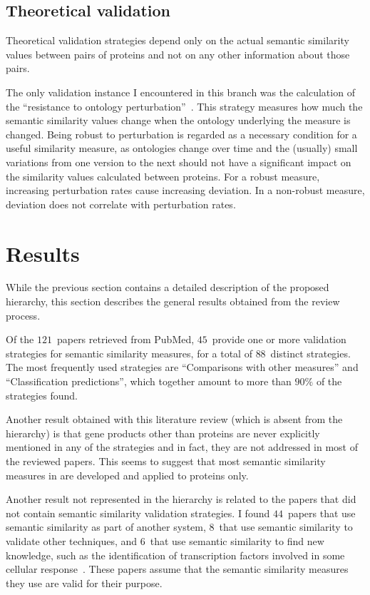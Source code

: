 \subsection{Theoretical validation} \label{sub:hierarchy/theoretical}

Theoretical validation strategies depend only on the actual semantic similarity values between pairs of proteins and not on any other information about those pairs.

The only validation instance I encountered in this branch was the calculation of the ``resistance to ontology perturbation''~\citep{Mathur2012}. This strategy measures how much the semantic similarity values change when the ontology underlying the measure is changed. Being robust to perturbation is regarded as a necessary condition for a useful similarity measure, as ontologies change over time and the (usually) small variations from one version to the next should not have a significant impact on the similarity values calculated between proteins. For a robust measure, increasing perturbation rates cause increasing deviation. In a non-robust measure, deviation does not correlate with perturbation rates.


\section{Results} \label{sec:validation/results}

While the previous section contains a detailed description of the proposed hierarchy, this section describes the general results obtained from the review process.

Of the $121$~papers retrieved from PubMed, $45$~provide one or more validation strategies for semantic similarity measures, for a total of $88$~distinct strategies. The most frequently used strategies are ``Comparisons with other measures'' and ``Classification predictions'', which together amount to more than $90\%$ of the strategies found.

Another result obtained with this literature review (which is absent from the hierarchy) is that gene products other than proteins are never explicitly mentioned in any of the strategies and in fact, they are not addressed in most of the reviewed papers. This seems to suggest that most semantic similarity measures in  are developed and applied to proteins only.

Another result not represented in the hierarchy is related to the papers that did not contain semantic similarity validation strategies. I found $44$~papers that use semantic similarity as part of another system, $8$~that use semantic similarity to validate other techniques, and $6$~that use semantic similarity to find new knowledge, such as the identification of transcription factors involved in some cellular response~\citep{Sekhwal2015}. These papers assume that the semantic similarity measures they use are valid for their purpose.

